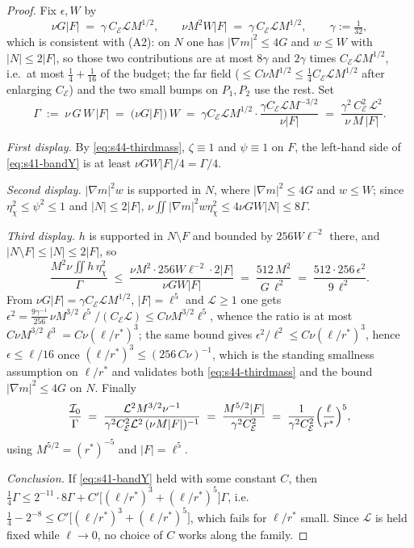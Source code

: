 \documentclass[11pt]{article}
\theoremstyle{definition}
\theoremstyle{remark}
\begin{document}
\begin{proof}
  Fix $\epsilon,W$ by
  \[
    \nu G|F| \;=\;\gamma\, C_{\mathcal{E}}\mathcal{L}M^{1/2},
    \qquad
    \nu M^2W|F| \;=\;\gamma\, C_{\mathcal{E}}\mathcal{L}M^{1/2},
    \qquad \gamma:=\tfrac1{32} ,
  \]
  which is consistent with (A2): on $N$ one has $|\nabla m|^2\leq4G$ and
  $w\leq W$ with $|N|\leq2|F|$, so those two contributions are at most
  $8\gamma$ and $2\gamma$ times $C_{\mathcal{E}}\mathcal{L}M^{1/2}$, i.e.\
  at most $\tfrac14+\tfrac1{16}$ of the budget; the far field
  ($\leq C\nu M^{1/2}\leq\tfrac14C_{\mathcal{E}}\mathcal{L}M^{1/2}$ after
  enlarging $C_{\mathcal{E}}$) and the two small bumps on $P_1,P_2$ use the
  rest. Set
  \[
    \Gamma \;:=\;\nu\,G\,W\,|F|
    \;=\;\bigl(\nu G|F|\bigr)\,W
    \;=\;\gamma C_{\mathcal{E}}\mathcal{L}M^{1/2}\cdot
      \frac{\gamma C_{\mathcal{E}}\mathcal{L}M^{-3/2}}{\nu|F|}
    \;=\;\frac{\gamma^2\,C_{\mathcal{E}}^2\,\mathcal{L}^2}{\nu\,M\,|F|} .
  \]

  \emph{First display.} By \eqref{eq:s44-thirdmass}, $\zeta\equiv1$ and
  $\psi\equiv1$ on $F$, the left-hand side of \eqref{eq:s41-bandY} is at least
  $\nu GW|F|/4=\Gamma/4$.

  \emph{Second display.} $|\nabla m|^2w$ is supported in $N$, where
  $|\nabla m|^2\leq4G$ and $w\leq W$; since $\eta_\chi^2\leq\psi^2\leq1$ and
  $|N|\leq2|F|$, $\nu\iint|\nabla m|^2w\eta_\chi^2\leq4\nu GW|N|\leq8\Gamma$.

  \emph{Third display.} $h$ is supported in $N\setminus F$ and bounded by
  $256W\ell^{-2}$ there, and $|N\setminus F|\leq|N|\leq2|F|$, so
  \[
    \frac{M^2\nu\iint h\,\eta_\chi^2}{\Gamma}
    \;\leq\;\frac{\nu M^2\cdot 256W\ell^{-2}\cdot 2|F|}{\nu GW|F|}
    \;=\;\frac{512\,M^2}{G\,\ell^{2}}
    \;=\;\frac{512\cdot 256\,\epsilon^2}{9\,\ell^{2}} .
  \]
  From $\nu G|F|=\gamma C_{\mathcal{E}}\mathcal{L}M^{1/2}$, $|F|=\ell^5$ and
  $\mathcal{L}\geq1$ one gets
  $\epsilon^2 = \tfrac{9\gamma^{-1}}{256}\,\nu M^{3/2}\ell^{5}
  /(C_{\mathcal{E}}\mathcal{L}) \leq C\nu M^{3/2}\ell^{5}$, whence the ratio is
  at most $C\nu M^{3/2}\ell^{3}=C\nu(\ell/r^*)^{3}$; the same bound gives
  $\epsilon^2/\ell^2\leq C\nu(\ell/r^*)^{3}$, hence $\epsilon\leq\ell/16$ once
  $(\ell/r^*)^{3}\leq(256\,C\nu)^{-1}$, which is the standing smallness
  assumption on $\ell/r^*$ and validates both \eqref{eq:s44-thirdmass} and the
  bound $|\nabla m|^2\leq4G$ on $N$. Finally
  \[
    \frac{\mathcal{I}_0}{\Gamma}
    \;=\;\frac{\mathcal{L}^2M^{3/2}\nu^{-1}}
      {\gamma^2C_{\mathcal{E}}^2\mathcal{L}^2\,(\nu M|F|)^{-1}}
    \;=\;\frac{M^{5/2}|F|}{\gamma^2C_{\mathcal{E}}^2}
    \;=\;\frac{1}{\gamma^2C_{\mathcal{E}}^2}
      \Bigl(\frac{\ell}{r^*}\Bigr)^{5} ,
  \]
  using $M^{5/2}=(r^*)^{-5}$ and $|F|=\ell^5$.

  \emph{Conclusion.} If \eqref{eq:s41-bandY} held with some constant $C$, then
  $\tfrac14\Gamma\leq 2^{-11}\cdot8\Gamma
  + C'\bigl[(\ell/r^*)^{3}+(\ell/r^*)^{5}\bigr]\Gamma$, i.e.\
  $\tfrac14-2^{-8}\leq C'\bigl[(\ell/r^*)^{3}+(\ell/r^*)^{5}\bigr]$, which
  fails for $\ell/r^*$ small. Since $\mathcal{L}$ is held fixed while
  $\ell\to0$, no choice of $C$ works along the family.
\end{proof}
\end{document}
